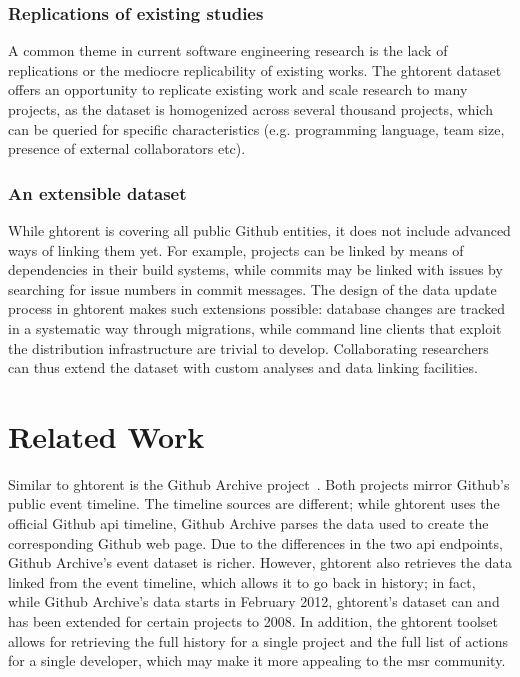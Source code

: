 \documentclass[conference]{IEEEtran}
\begin{document}
\subsubsection{Replications of existing studies} A common theme in current
software engineering research is the lack of replications or the
mediocre replicability of existing works. The {\sc ght}orent dataset offers
an opportunity to replicate existing work and scale research to many
projects, as the dataset is homogenized across several thousand projects,
which can be queried for specific characteristics (e.g. programming language,
team size, presence of external collaborators etc).

\subsubsection{An extensible dataset} While {\sc ght}orent is covering all 
 public Github entities, it does not include advanced ways of
linking them yet. For example, projects can be linked by means of dependencies
in their build systems, while commits may be linked with issues by
searching for issue numbers in commit messages. The design of the
data update process in {\sc ght}orent makes such extensions possible:
database changes are tracked in a systematic way through migrations, while  
command line clients that exploit the distribution infrastructure are
trivial to develop. Collaborating researchers can thus extend the dataset
with custom analyses and data linking facilities.


\section{Related Work}

Similar to {\sc ght}orent is the Github Archive project~\cite{Grigo13}.  Both
projects mirror Github's public event timeline. The timeline sources are
different; while {\sc ght}orent uses the official Github {\sc api} timeline, Github
Archive parses the data used to create the corresponding Github web page.  Due
to the differences in the two {\sc api} endpoints, Github Archive's event
dataset is richer.  However, {\sc ght}orent also retrieves the data linked from the
event timeline, which allows it to go back in history; in fact, while Github
Archive's data starts in February 2012, {\sc ght}orent's dataset can and has been
extended for certain projects to 2008.  In addition, the {\sc ght}orent toolset
allows for retrieving the full history for a single project and the full list of
actions for a single developer, which may make it more appealing to the {\sc
msr} community.
\end{document}
